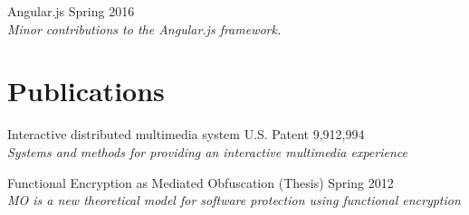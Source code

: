 \documentclass[line,margin]{res}
\begin{document}
\begin{resume}
        Angular.js \hfill Spring 2016\\
            \emph{Minor contributions to the Angular.js framework.}
            
            
\section{\sc Publications}
        Interactive distributed multimedia system \hfill U.S. Patent 9,912,994\\
            \emph{Systems and methods for providing an interactive multimedia experience}
            
        Functional Encryption as Mediated Obfuscation (Thesis) \hfill Spring 2012\\
            \emph{MO is a new theoretical model for software protection using functional encryption}
\end{resume}
\end{document}
